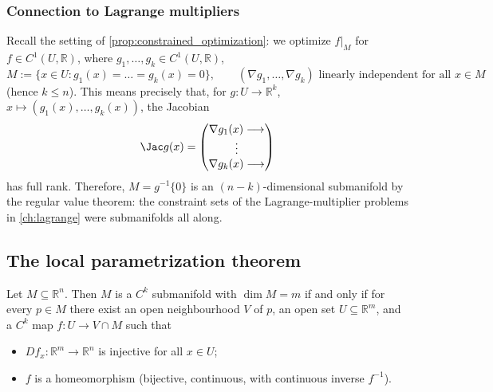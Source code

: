 \subsubsection{Connection to Lagrange multipliers}

\begin{remark}
Recall the setting of \cref{prop:constrained_optimization}: we optimize $f|_M$ for
$f \in C^1(U,\mathbb{R})$, where $g_1,\dots,g_k \in C^1(U,\mathbb{R})$,
\[M := \{x \in U : g_1(x)=\dots=g_k(x)=0\}, \qquad (\nabla g_1,\dots,\nabla g_k) \text{ linearly independent for all } x \in M\]
(hence $k \leq n$). This means precisely that, for $g : U \to \mathbb{R}^k$,
$x \mapsto (g_1(x),\dots,g_k(x))$, the Jacobian
\[\Jac g(x) = \begin{pmatrix} \nabla g_1(x) \longrightarrow \\ \vdots \\ \nabla g_k(x) \longrightarrow \end{pmatrix}\]
has full rank. Therefore, $M = g^{-1}\{0\}$ is an $(n-k)$-dimensional submanifold by the regular
value theorem: the constraint sets of the Lagrange-multiplier problems in \cref{ch:lagrange}
were submanifolds all
along.
\end{remark}

\subsection{The local parametrization theorem}

\begin{theorem}
\label{thm:local_parametrization}
Let $M \subseteq \mathbb{R}^n$. Then $M$ is a $C^k$ submanifold with $\dim M = m$ if and only if
for every $p \in M$ there exist an open neighbourhood $V$ of $p$, an open set $U \subseteq
\mathbb{R}^m$, and a $C^k$ map $f : U \to V \cap M$ such that
\begin{itemize}
  \item $Df_x : \mathbb{R}^m \to \mathbb{R}^n$ is injective for all $x \in U$;
  \item $f$ is a homeomorphism (bijective, continuous, with continuous inverse $f^{-1}$).
\end{itemize}
\end{theorem}

